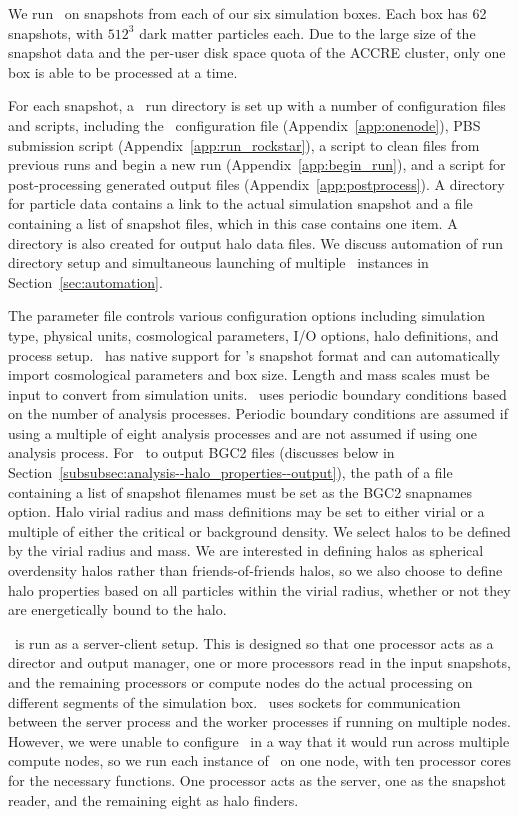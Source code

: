 We run \rockstar\ on snapshots from each of our six simulation boxes.  Each box has 62 snapshots, with $512^{3}$ dark matter particles each.  Due to the large size of the snapshot data and the per-user disk space quota of the ACCRE cluster, only one box is able to be processed at a time.

For each snapshot, a \rockstar\ run directory is set up with a number of configuration files and scripts, including the \rockstar\ configuration file (Appendix~\ref{app:onenode}), PBS submission script (Appendix~\ref{app:run_rockstar}), a script to clean files from previous runs and begin a new run (Appendix~\ref{app:begin_run}), and a script for post-processing generated output files (Appendix~\ref{app:postprocess}).  A directory for particle data contains a link to the actual simulation snapshot and a file containing a list of snapshot files, which in this case contains one item.  A directory is also created for output halo data files.  We discuss automation of run directory setup and simultaneous launching of multiple \rockstar\ instances in Section~\ref{sec:automation}.

The parameter file controls various configuration options including simulation type, physical units, cosmological parameters, I/O options, halo definitions, and process setup.  \rockstar\ has native support for \gadget's snapshot format and can automatically import cosmological parameters and box size.  Length and mass scales must be input to convert from simulation units.  \rockstar\ uses periodic boundary conditions based on the number of analysis processes.  Periodic boundary conditions are assumed if using a multiple of eight analysis processes and are not assumed if using one analysis process.  For \rockstar\ to output BGC2 files (discusses below in Section~\ref{subsubsec:analysis--halo_properties--output}), the path of a file containing a list of snapshot filenames must be set as the BGC2 snapnames option.  Halo virial radius and mass definitions may be set to either virial or a multiple of either the critical or background density.  We select halos to be defined by the virial radius and mass.  We are interested in defining halos as spherical overdensity halos rather than friends-of-friends halos, so we also choose to define halo properties based on all particles within the virial radius, whether or not they are energetically bound to the halo.

\rockstar\ is run as a server-client setup.  This is designed so that one processor acts as a director and output manager, one or more processors read in the input snapshots, and the remaining processors or compute nodes do the actual processing on different segments of the simulation box.  \rockstar\ uses sockets for communication between the server process and the worker processes if running on multiple nodes.  However, we were unable to configure \rockstar\ in a way that it would run across multiple compute nodes, so we run each instance of \rockstar\ on one node, with ten processor cores for the necessary functions.  One processor acts as the server, one as the snapshot reader, and the remaining eight as halo finders.



